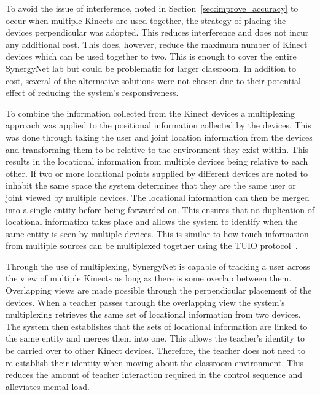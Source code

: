 \documentclass[manuscript, review, screen]{acmart}
\begin{document}
To avoid the issue of interference, noted in Section~\ref{sec:improve_accuracy} to occur when multiple Kinects are used together, the strategy of placing the devices perpendicular was adopted.
This reduces interference and does not incur any additional cost.
This does, however, reduce the maximum number of Kinect devices which can be used together to two.
This is enough to cover the entire SynergyNet lab but could be problematic for larger classroom.
In addition to cost, several of the alternative solutions were not chosen due to their potential effect of reducing the system's responsiveness.

To combine the information collected from the Kinect devices a multiplexing approach was applied to the positional information collected by the devices.
This was done through taking the user and joint location information from the devices and transforming them to be relative to the environment they exist within.
This results in the locational information from multiple devices being relative to each other.
If two or more locational points supplied by different devices are noted to inhabit the same space the system determines that they are the same user or joint viewed by multiple devices.
The locational information can then be merged into a single entity before being forwarded on.
This ensures that no duplication of locational information takes place and allows the system to identify when the same entity is seen by multiple devices.
This is similar to how touch information from multiple sources can be multiplexed together using the TUIO protocol~\cite{Kaltenbrunner2009}.

Through the use of multiplexing, SynergyNet is capable of tracking a user across the view of multiple Kinects as long as there is some overlap between them.
Overlapping views are made possible through the perpendicular placement of the devices. 
When a teacher passes through the overlapping view the system's multiplexing retrieves the same set of locational information from two devices.
The system then establishes that the sets of locational information are linked to the same entity and merges them into one.
This allows the teacher's identity to be carried over to other Kinect devices.
Therefore, the teacher does not need to re-establish their identity when moving about the classroom environment.
This reduces the amount of teacher interaction required in the control sequence and alleviates mental load. 
\end{document}
